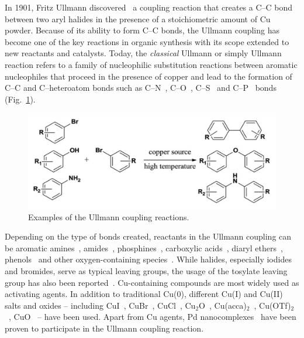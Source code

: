 \documentclass[%
 reprint,
 amsmath,amssymb,
 aps,
prb,
]{revtex4-2}
\begin{document}
In 1901, Fritz Ullmann discovered~\cite{ullmann_01} a coupling reaction that creates a C--C bond between two aryl halides in the presence of a stoichiometric amount of Cu powder. 
Because of its ability to form C--C bonds, the Ullmann coupling has become one of the key reactions in organic synthesis with its scope extended to new reactants and catalysts. 
Today, the \emph{classical} Ullmann or simply Ullmann reaction refers to a family of nucleophilic substitution reactions between aromatic nucleophiles that proceed in the presence of copper and lead to the formation of C--C and C--heteroatom bonds such as C--N~\cite{ullmann_02, ullmann_03}, C--O~\cite{ullmann_04}, C--S~\cite{ullmann_05} and C--P~\cite{ullmann_21,ullmann_22} bonds (Fig.~\ref{fig:UllmannCoupling}). 

\begin{figure}[htb]
\centering
\includegraphics[width=0.90\columnwidth]{Fig/classical.png}
\caption{Examples of the Ullmann coupling reactions.}
\label{fig:UllmannCoupling}
\end{figure}

Depending on the type of bonds created, reactants in the Ullmann coupling can be aromatic amines~\cite{ullmann_17,ullmann_18}, amides~\cite{ullmann_19,ullmann_20}, phosphines~\cite{ullmann_21,ullmann_22}, carboxylic acids~\cite{ullmann_23}, diaryl ethers~\cite{ullmann_24}, phenols~\cite{ullmann_25} and other oxygen-containing species~\cite{ullmann_26,ullmann_27,ullmann_28}. 
While halides, especially iodides and bromides, serve as typical leaving groups, the usage of the tosylate leaving group has also been reported~\cite{ullmann_15}. 
Cu-containing compounds are most widely used as activating agents. In addition to traditional Cu(0), different Cu(I) and Cu(II) salts and oxides -- including CuI~\cite{ullmann_07,ullmann_08,ullmann_09}, CuBr~\cite{ullmann_10,ullmann_11}, CuCl~\cite{ullmann_13}, Cu$_2$O~\cite{ullmann_12}, Cu(acca)$_2$~\cite{ullmann_14}, Cu(OTf)$_2$~\cite{ullmann_15}, CuO~\cite{ullmann_16} -- have been used. 
Apart from Cu agents, Pd nanocomplexes~\cite{ullmann_35, ullmann_36}  have been proven to participate in the Ullmann coupling reaction. 
\end{document}
